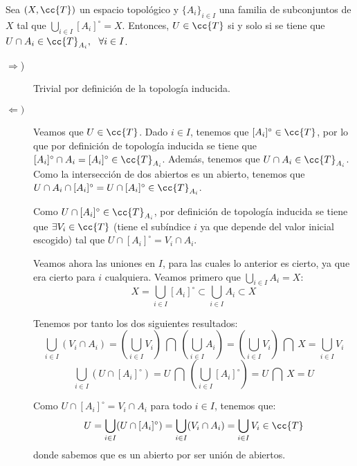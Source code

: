 \begin{ejercicio}
    Sea $(X,\cc{T})$ un espacio topológico y $\{A_i\}_{i\in I}$ una familia de subconjuntos de $X$ tal que $\bigcup\limits_{i\in I}[A_i]^\circ=X$. Entonces, $U\in \cc{T}$ si y solo si se tiene que $U\cap A_i\in \cc{T}_{A_i},~~\forall i\in I$.
    \begin{description}
        \item[$\Longrightarrow$)] Trivial por definición de la topología inducida.

        \item[$\Longleftarrow)$] Veamos que $U\in \cc{T}$. Dado $i\in I$, tenemos que $[A_i]^\circ\in \cc{T}$, por lo que por definición de topología inducida se tiene que $[A_i]^\circ \cap A_i = [A_i]^\circ \in \cc{T}_{A_i}$. Además, tenemos que $U\cap A_i\in \cc{T}_{A_i}$. Como la intersección de dos abiertos es un abierto, tenemos que $U\cap A_i\cap [A_i]^\circ =U\cap [A_i]^\circ \in \cc{T}_{A_i}$.

        Como $U\cap [A_i]^\circ \in \cc{T}_{A_i}$, por definición de topología inducida se tiene que $\exists V_i\in \cc{T}$ (tiene el subíndice $i$ ya que depende del valor inicial escogido) tal que $U\cap [A_i]^\circ=V_i\cap A_i$.

        Veamos ahora las uniones en $I$, para las cuales lo anterior es cierto, ya que era cierto para $i$ cualquiera. Veamos primero que $\bigcup\limits_{i\in I} A_i=X$:
        \begin{equation*}
            X=\bigcup_{i\in I} [A_i]^\circ \subset \bigcup_{i\in I} A_i\subset X
        \end{equation*}
        
        Tenemos por tanto los dos siguientes resultados:
        \begin{equation*}
            \bigcup_{i\in I} (V_i\cap A_i) = \left(\bigcup_{i\in I} V_i\right) ~\bigcap~\left(\bigcup_{i\in I} A_i\right)
            = \left(\bigcup_{i\in I} V_i\right) ~\bigcap~ X = \bigcup_{i\in I} V_i
        \end{equation*}
        \begin{equation*}
            \bigcup_{i\in I} (U\cap [A_i]^\circ) = U ~\bigcap~\left(\bigcup_{i\in I} [A_i]^\circ\right)
            = U ~\bigcap~ X = U
        \end{equation*}

        Como $U\cap [A_i]^\circ=V_i\cap A_i$ para todo $i\in I$, tenemos que:
        \begin{equation*}
            U=\bigcup_{i\in I} (U\cap [A_i]^\circ) = \bigcup_{i\in I} (V_i\cap A_i)= \bigcup_{i\in I} V_i \in \cc{T}
        \end{equation*}
        donde sabemos que es un abierto por ser unión de abiertos.
    \end{description}
\end{ejercicio}

